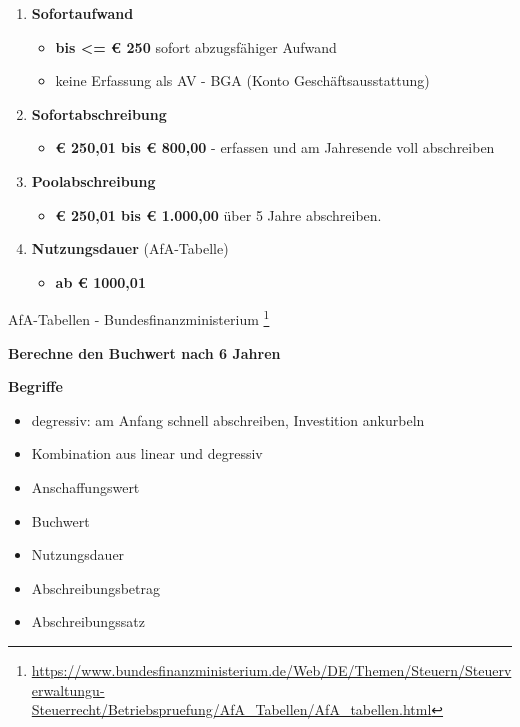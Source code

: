 \begin{enumerate}
\item
  \textbf{Sofortaufwand}

  \begin{itemize}
  \item
    \textbf{bis \textless= € 250} sofort abzugsfähiger Aufwand
  \item
    keine Erfassung als AV - BGA (Konto Geschäftsausstattung)
  \end{itemize}
\item
  \textbf{Sofortabschreibung}

  \begin{itemize}
  \item
    \textbf{€ 250,01 bis € 800,00} - erfassen und am Jahresende voll
    abschreiben
  \end{itemize}
\item
  \textbf{Poolabschreibung}

  \begin{itemize}
  \item
    \textbf{€ 250,01 bis € 1.000,00} über 5 Jahre abschreiben.
  \end{itemize}
\item
  \textbf{Nutzungsdauer} (AfA-Tabelle)

  \begin{itemize}
  \item
    \textbf{ab € 1000,01}
  \end{itemize}
\end{enumerate}

AfA-Tabellen - Bundesfinanzministerium \footnote{\url{https://www.bundesfinanzministerium.de/Web/DE/Themen/Steuern/Steuerverwaltungu-Steuerrecht/Betriebspruefung/AfA_Tabellen/AfA_tabellen.html}}

\textbf{Berechne den Buchwert nach 6 Jahren}

\textbf{Begriffe}

\begin{itemize}
\item
  degressiv: am Anfang schnell abschreiben, Investition ankurbeln
\item
  Kombination aus linear und degressiv
\item
  Anschaffungswert
\item
  Buchwert
\item
  Nutzungsdauer
\item
  Abschreibungsbetrag
\item
  Abschreibungssatz
\end{itemize}

